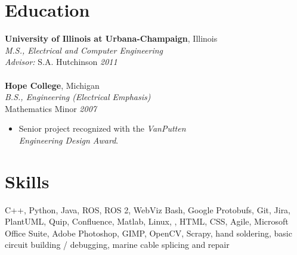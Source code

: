 \documentclass[11pt,twoside,a4paper]{article}
\begin{document}
{\begin{multicols}{2}
            \section*{Education}
            \noindent \textbf{University of Illinois at Urbana-Champaign}, Illinois\\
            \textsl{M.S., Electrical and Computer Engineering}\\
            \textsl{Advisor:} S.A. Hutchinson \hfill \textsl{2011}\\\vspace{0px}\\
            \noindent \textbf{Hope College}, Michigan\\
            \textsl{B.S., Engineering (Electrical Emphasis)}\\
            Mathematics Minor \hfill \textsl{2007}\\
                \vspace{ -10px}
                \begin{itemize}[noitemsep,nolistsep]
                    \item Senior project recognized with the \textit{VanPutten\\ Engineering Design Award}.
                \end{itemize}
                \vspace{5px}
                \section*{Skills} 
                \noindent
                C++, Python, Java, ROS, ROS 2, WebViz Bash, Google Protobufs, Git, Jira, PlantUML, Quip, Confluence, Matlab, Linux, \LaTeXe, HTML, CSS, Agile, Microsoft Office Suite, Adobe Photoshop, GIMP, OpenCV, Scrapy, hand soldering, basic circuit building / debugging, marine cable splicing and repair
          \newpage
          \vspace*{ 0.5 in }

\end{multicols}}
\end{document}
